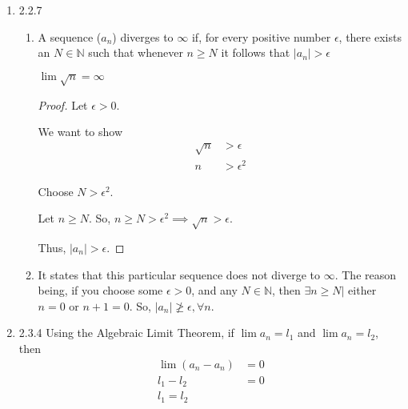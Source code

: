 \documentclass[12pt,letterpaper]{article}
\begin{document}
\begin{enumerate}
\begin{enumerate}
\begin{proof}
            Let $n \ge N$.
            So, $n \ge N > 10 \implies \left \lfloor \frac{10 + n}{2n} \right \rfloor = 0 < \epsilon$.

            Thus, $|a_n - 0| < \epsilon$.
          \end{proof}
      \end{enumerate}

    \item 2.2.7
      \begin{enumerate}
        \item A sequence ($a_n$) diverges to $\infty$ if,
          for every positive number $\epsilon$,
          there exists an $N \in \mathbb{N}$ such that
          whenever $n \ge N$ it follows that $|a_n| > \epsilon$

          $\lim \sqrt{n} = \infty$

          \begin{proof}
            Let $\epsilon > 0$.

            We want to show
            \begin{align*}
              \sqrt{n} &> \epsilon \\
              n &> \epsilon^2
            \end{align*}

            Choose $N > \epsilon^2$.

            Let $n \ge N$.
            So, $n \ge N > \epsilon^2 \implies \sqrt{n} > \epsilon$.

            Thus, $|a_n| > \epsilon$.
          \end{proof}

        \item
          It states that this particular sequence does not diverge to $\infty$.
          The reason being,
          if you choose some $\epsilon > 0$, and any $N \in \mathbb{N}$,
          then $\exists n \ge N |$ either $n = 0$ or $n+1 = 0$.
          So, $|a_n| \not\ge \epsilon, \forall n$.
      \end{enumerate}

    \item 2.3.4
      Using the Algebraic Limit Theorem,
      if $\lim a_n = l_1$ and $\lim a_n = l_2$,
      then
      \begin{align*}
        \lim (a_n - a_n) &= 0 \\
        l_1 - l_2 &= 0 \\
        l_1 = l_2 \\
      \end{align*}
  \end{enumerate}
\end{document}
